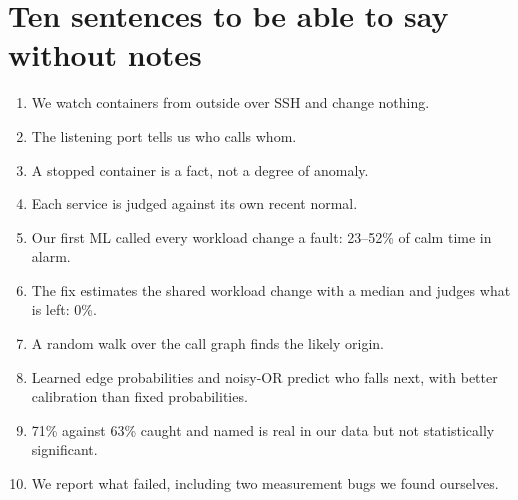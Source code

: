 \section{Ten sentences to be able to say without notes}
\begin{enumerate}
\item We watch containers from outside over SSH and change nothing.
\item The listening port tells us who calls whom.
\item A stopped container is a fact, not a degree of anomaly.
\item Each service is judged against its own recent normal.
\item Our first ML called every workload change a fault: 23--52\% of calm time in alarm.
\item The fix estimates the shared workload change with a median and judges what is left: 0\%.
\item A random walk over the call graph finds the likely origin.
\item Learned edge probabilities and noisy-OR predict who falls next, with better calibration than fixed probabilities.
\item 71\% against 63\% caught and named is real in our data but not statistically significant.
\item We report what failed, including two measurement bugs we found ourselves.
\end{enumerate}
